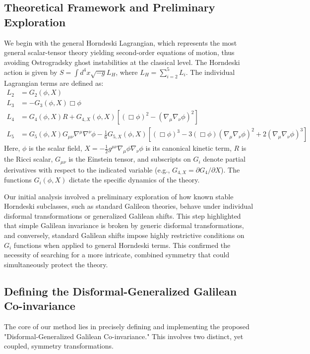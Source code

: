 \documentclass[twocolumn]{aastex631}
\begin{document}
\subsection{Theoretical Framework and Preliminary Exploration}
We begin with the general Horndeski Lagrangian, which represents the most general scalar-tensor theory yielding second-order equations of motion, thus avoiding Ostrogradsky ghost instabilities at the classical level. The Horndeski action is given by $S = \int d^4x \sqrt{-g} L_H$, where $L_H = \sum_{i=2}^{5} L_i$. The individual Lagrangian terms are defined as:
\begin{align*}
L_2 &= G_2(\phi, X) \\
L_3 &= -G_3(\phi, X) \Box\phi \\
L_4 &= G_4(\phi, X) R + G_{4,X}(\phi, X) [(\Box\phi)^2 - (\nabla_\mu\nabla_\nu\phi)^2] \\
L_5 &= G_5(\phi, X) G_{\mu\nu} \nabla^\mu\nabla^\nu\phi - \frac{1}{6} G_{5,X}(\phi, X) [(\Box\phi)^3 - 3(\Box\phi)(\nabla_\mu\nabla_\nu\phi)^2 + 2(\nabla_\mu\nabla_\nu\phi)^3]
\end{align*}
Here, $\phi$ is the scalar field, $X = -\frac{1}{2}g^{\mu\nu}\nabla_\mu\phi\nabla_\nu\phi$ is its canonical kinetic term, $R$ is the Ricci scalar, $G_{\mu\nu}$ is the Einstein tensor, and subscripts on $G_i$ denote partial derivatives with respect to the indicated variable (e.g., $G_{4,X} = \partial G_4 / \partial X$). The functions $G_i(\phi, X)$ dictate the specific dynamics of the theory.

Our initial analysis involved a preliminary exploration of how known stable Horndeski subclasses, such as standard Galileon theories, behave under individual disformal transformations or generalized Galilean shifts. This step highlighted that simple Galilean invariance is broken by generic disformal transformations, and conversely, standard Galilean shifts impose highly restrictive conditions on $G_i$ functions when applied to general Horndeski terms. This confirmed the necessity of searching for a more intricate, combined symmetry that could simultaneously protect the theory.

\subsection{Defining the Disformal-Generalized Galilean Co-invariance}
The core of our method lies in precisely defining and implementing the proposed "Disformal-Generalized Galilean Co-invariance." This involves two distinct, yet coupled, symmetry transformations.
\end{document}
